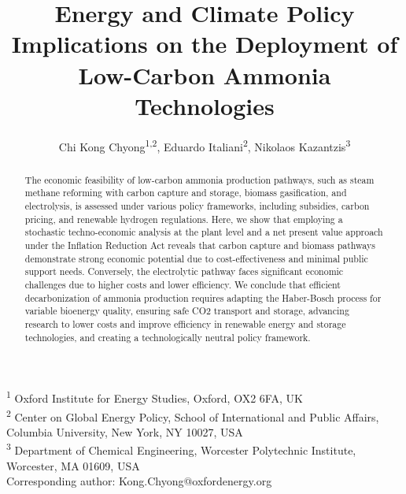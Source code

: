 \documentclass{article}
\title{Energy and Climate Policy Implications on the Deployment of Low-Carbon Ammonia Technologies}
\author{Chi Kong Chyong\textsuperscript{1,2}, Eduardo Italiani\textsuperscript{2}, Nikolaos Kazantzis\textsuperscript{3}}
\date{}
\begin{document}
\linenumbers

\maketitle

\noindent\textsuperscript{1} Oxford Institute for Energy Studies, Oxford, OX2 6FA, UK\\
\textsuperscript{2} Center on Global Energy Policy, School of International and Public Affairs, Columbia University, New York, NY 10027, USA\\
\textsuperscript{3} Department of Chemical Engineering, Worcester Polytechnic Institute, Worcester, MA 01609, USA\\
Corresponding author: Kong.Chyong@oxfordenergy.org



\begin{abstract}
    The economic feasibility of low-carbon ammonia production pathways, such as steam methane reforming with carbon capture and storage, biomass gasification, and electrolysis, is assessed under various policy frameworks, including subsidies, carbon pricing, and renewable hydrogen regulations. Here, we show that employing a stochastic techno-economic analysis at the plant level and a net present value approach under the Inflation Reduction Act reveals that carbon capture and biomass pathways demonstrate strong economic potential due to cost-effectiveness and minimal public support needs. Conversely, the electrolytic pathway faces significant economic challenges due to higher costs and lower efficiency. We conclude that efficient decarbonization of ammonia production requires adapting the Haber-Bosch process for variable bioenergy quality, ensuring safe CO2 transport and storage, advancing research to lower costs and improve efficiency in renewable energy and storage technologies, and creating a technologically neutral policy framework.
\end{abstract}
\end{document}
